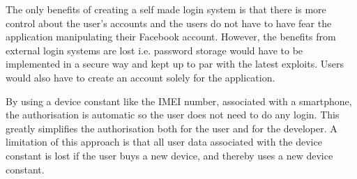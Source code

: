 The only benefits of creating a self made login system is that there is more control about the user's accounts and the users do not have to have fear the application manipulating their Facebook account. However, the benefits from external login systems are lost i.e. password storage would have to be implemented in a secure way and kept up to par with the latest exploits. Users would also have to create an account solely for the application.

By using a device constant like the IMEI number, associated with a smartphone, the authorisation is automatic so the user does not need to do any login. This greatly simplifies the authorisation both for the user and for the developer. A limitation of this approach is that all user data associated with the device constant is lost if the user buys a new device, and thereby uses a new device constant.
